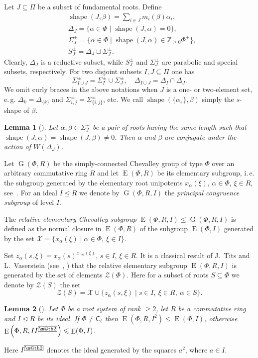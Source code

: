 \documentclass[11pt]{amsart}
\makeatletter
\theoremstyle{plain}
\numberwithin{equation}{section}
\newtheorem{lemma}{Lemma}
\numberwithin{lemma}{section}
\theoremstyle{definition}
\theoremstyle{remark}
\DeclareMathOperator{\G}{G}
\DeclareMathOperator{\E}{E}
\DeclareMathOperator{\shape}{shape}
\newcommand{\rC}{\mathsf{C}}
\newcommand{\indexbox}[1]{\text{\fboxsep=.1em\fbox{\m@th$\displaystyle#1$}}}
\makeatother
\begin{document}
Let $J\subseteq \Pi$ be a subset of fundamental roots. Define
\begin{align*}
& \shape(J, \beta)=\sum\nolimits_{i\in J} m_i(\beta) \alpha_i, \\
& \Delta_J = \{\alpha \in \Phi \mid \shape(J, \alpha)=0\}, \\
& \Sigma^\pm_J = \{\alpha \in \Phi \mid \shape(J, \alpha) \in \mathbb{Z}_{\geqslant0} \Phi^\pm \}, \\
& S_J^\pm = \Delta_J \sqcup \Sigma_J^\pm.
\end{align*}
Clearly, $\Delta_J$ is a reductive subset, while $S^\pm_J$ and $\Sigma^\pm_J$ are parabolic and special subsets, respectively.
For two disjoint subsets $I, J\subseteq \Pi$ one has 
\[ \Sigma^\pm_{I \cup J} = \Sigma^\pm_I\cup\Sigma^\pm_J, \quad \Delta_{I\cup J} = \Delta_I \cap \Delta_J. \]
We omit curly braces in the above notations when $J$ is a one- or two-element set, e.\,g. $\Delta_k=\Delta_{\{k\}}$ and $\Sigma_{i, j}^\pm=\Sigma_{\{i, j\}}^\pm$, etc.
We call $\shape(\{\alpha_s\}, \beta)$ simply the $s$-shape of $\beta$.

\begin{lemma}[{\cite[Lemma~1]{ABS}}]\label{lemma:abs}
Let $\alpha, \beta \in \Sigma^\pm_J$ be a pair of roots having the same length such that $\shape(J, \alpha)=\shape(J, \beta)\neq 0$.
Then $\alpha$ and $\beta$ are conjugate under the action of $W(\Delta_J)$.
\end{lemma}

Let $\G(\Phi, R)$ be the simply-connected Chevalley group of type $\Phi$ over an arbitrary commutative ring $R$ and let $\E(\Phi, R)$ be its elementary subgroup,
i.\,e. the subgroup generated by the elementary root unipotents $x_\alpha(\xi)$, $\alpha\in\Phi$, $\xi\in R$, see~\cite{VP, St78, S}.
For an ideal $I \trianglelefteq R$ we denote by $\G(\Phi, R, I)$ the \emph{principal congruence subgroup} of level $I$.

The \emph{relative elementary Chevalley subgroup} $\E(\Phi, R, I) \leqslant \G(\Phi, R, I)$ is defined as the normal closure in $\E(\Phi, R)$ of the subgroup $\E(\Phi, I)$ generated by the set $\mathcal{X} = \{x_\alpha(\xi) \mid \alpha\in \Phi, \ \xi \in I \}$.

Set $z_\alpha(s, \xi) = x_{\alpha}(s)^{x_{-\alpha}(\xi)}$, $s\in I$, $\xi\in R$.
It is a classical result of J.~Tits and L.~Vaserstein (see~\cite{Tits76}, \cite[Theorem~2]{Va86}) that the relative elementary subgroup $\E(\Phi, R, I)$ is generated by the set of elements $\mathcal{Z}(\Phi)$.
Here for a subset of roots $S\subseteq\Phi$ we denote by $\mathcal{Z}(S)$ the set
\[ \mathcal{Z}(S) =  \mathcal{X} \cup \{ z_\alpha(s, \xi) \mid s\in I, \ \xi \in R, \ \alpha \in S\}.\]
\begin{lemma}[{\cite[Corollary~3.3]{S}}]\label{lemma:Stepanov-ideal}
Let $\Phi$ be a root system of rank $\geqslant2$, let $R$ be a commutative ring and $I\trianglelefteq R$ be its ideal.
If $\Phi\neq\rC_\ell$ then $\E\left(\Phi, R, I^2\right)\leqslant\E(\Phi, I)$, otherwise $\E\left(\Phi, R, II^{\indexbox{2}}\right)\leqslant\E(\Phi, I)$.
\end{lemma}
Here $I^{\indexbox{2}}$ denotes the ideal generated by the squares $a^2$, where $a\in I$.
\end{document}
